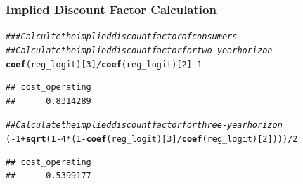 \documentclass{beamer}\usepackage[]{graphicx}\usepackage[]{color}
\makeatletter
\newcommand{\hlnum}[1]{\textcolor[rgb]{0.686,0.059,0.569}{#1}}%
\newcommand{\hlstr}[1]{\textcolor[rgb]{0.192,0.494,0.8}{#1}}%
\newcommand{\hlcom}[1]{\textcolor[rgb]{0.678,0.584,0.686}{\textit{#1}}}%
\newcommand{\hlopt}[1]{\textcolor[rgb]{0,0,0}{#1}}%
\newcommand{\hlstd}[1]{\textcolor[rgb]{0.345,0.345,0.345}{#1}}%
\newcommand{\hlkwc}[1]{\textcolor[rgb]{0.333,0.667,0.333}{#1}}%
\newcommand{\hlkwd}[1]{\textcolor[rgb]{0.737,0.353,0.396}{\textbf{#1}}}%
\newenvironment{kframe}{%
 \def\at@end@of@kframe{}%
 \ifinner\ifhmode%
  \def\at@end@of@kframe{\end{minipage}}%
  \begin{minipage}{\columnwidth}%
 \fi\fi%
 \def\FrameCommand##1{\hskip\@totalleftmargin \hskip-\fboxsep
 \colorbox{shadecolor}{##1}\hskip-\fboxsep
     \hskip-\linewidth \hskip-\@totalleftmargin \hskip\columnwidth}%
 \MakeFramed {\advance\hsize-\width
   \@totalleftmargin\z@ \linewidth\hsize
   \@setminipage}}%
 {\par\unskip\endMakeFramed%
 \at@end@of@kframe}
\newenvironment{knitrout}{}{} %
\makeatother
\begin{document}
\begin{frame}[fragile]\frametitle{Implied Discount Factor Calculation}
\begin{knitrout}\footnotesize
{}\color{fgcolor}\begin{kframe}
\begin{alltt}
\hlcom{### Calculte the implied discount factor of consumers}
\hlcom{## Calculate the implied discount factor for two-year horizon}
\hlkwd{coef}\hlstd{(reg_logit)[}\hlnum{3}\hlstd{]} \hlopt{/} \hlkwd{coef}\hlstd{(reg_logit)[}\hlnum{2}\hlstd{]} \hlopt{-} \hlnum{1}
\end{alltt}
\begin{verbatim}
## cost_operating 
##      0.8314289
\end{verbatim}
\begin{alltt}
\hlcom{## Calculate the implied discount factor for three-year horizon}
\hlstd{(}\hlopt{-}\hlnum{1} \hlopt{+} \hlkwd{sqrt}\hlstd{(}\hlnum{1} \hlopt{-} \hlnum{4} \hlopt{*} \hlstd{(}\hlnum{1} \hlopt{-} \hlkwd{coef}\hlstd{(reg_logit)[}\hlnum{3}\hlstd{]} \hlopt{/} \hlkwd{coef}\hlstd{(reg_logit)[}\hlnum{2}\hlstd{])))} \hlopt{/} \hlnum{2}
\end{alltt}
\begin{verbatim}
## cost_operating 
##      0.5399177
\end{verbatim}
\end{kframe}
\end{knitrout}
\end{frame}

\end{document}
